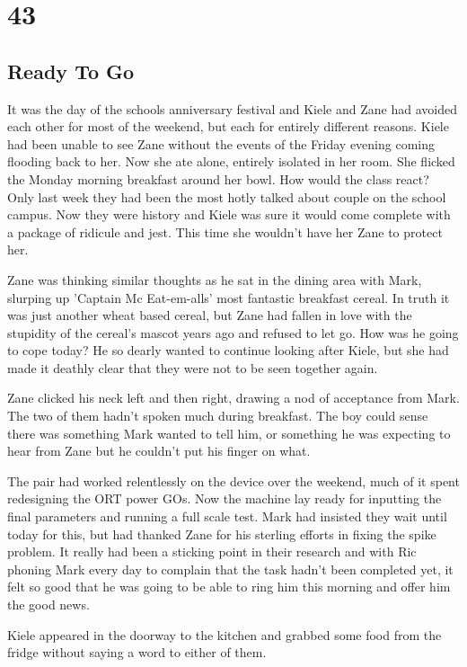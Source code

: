 \chapter{43}
\section{Ready To Go}


It was the day of the schools anniversary festival and Kiele and Zane had avoided each other for most of the weekend, but each for entirely different reasons.  Kiele had been unable to see Zane without the events of the Friday evening coming flooding back to her.  Now she ate alone, entirely isolated in her room.  She flicked the Monday morning breakfast around her bowl.  How would the class react?  Only last week they had been the most hotly talked about couple on the school campus.  Now they were history and Kiele was sure it would come complete with a package of ridicule and jest.  This time she wouldn't have her Zane to protect her.

Zane was thinking similar thoughts as he sat in the dining area with Mark, slurping up 'Captain Mc Eat-em-alls' most fantastic breakfast cereal.  In truth it was just another wheat based cereal, but Zane had fallen in love with the stupidity of the cereal's mascot years ago and refused to let go.  How was he going to cope today?  He so dearly wanted to continue looking after Kiele, but she had made it deathly clear that they were not to be seen together again.

Zane clicked his neck left and then right, drawing a nod of acceptance from Mark.  The two of them hadn't spoken much during breakfast.  The boy could sense there was something Mark wanted to tell him, or something he was expecting to hear from Zane but he couldn't put his finger on what.

The pair had worked relentlessly on the device over the weekend, much of it spent redesigning the ORT power GOs.  Now the machine lay ready for inputting the final parameters and running a full scale test.  Mark had insisted they wait until today for this, but had thanked Zane for his sterling efforts in fixing the spike problem.  It really had been a sticking point in their research and with Ric phoning Mark every day to complain that the task hadn't been completed yet, it felt so good that he was going to be able to ring him this morning and offer him the good news.

Kiele appeared in the doorway to the kitchen and grabbed some food from the fridge without saying a word to either of them.

